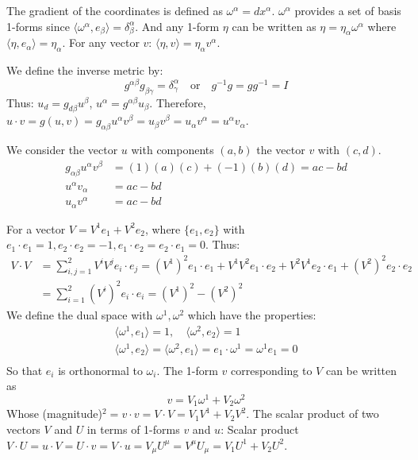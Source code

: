 \documentclass{article}
\begin{document}
    The gradient of the coordinates is defined as $\omega^\alpha = dx^\alpha$.
    $\omega^\alpha$ provides a set of basis 1-forms since $\langle \omega^\alpha, e_\beta \rangle = \delta^\alpha_\beta$.
    And any 1-form $\eta$ can be written as $\eta = \eta_\alpha \omega^\alpha$ where $\langle \eta, e_\alpha \rangle = \eta_\alpha$.
    For any vector $v$: $\langle \eta, v \rangle = \eta_\alpha v^\alpha$.
    
    We define the inverse metric by:
    $$ g^{\alpha\beta} g_{\beta\gamma} = \delta^\alpha_\gamma \quad \text{or} \quad g^{-1}g=gg^{-1}=I $$
    Thus: $u_d = g_{d\beta} u^\beta$, $u^\alpha = g^{\alpha\beta} u_\beta$.
    Therefore, $u \cdot v = g(u, v) = g_{\alpha\beta} u^\alpha v^\beta = u_\beta v^\beta = u_\alpha v^\alpha = u^\alpha v_\alpha$.
    
    We consider the vector $u$ with components $(a,b)$ the vector $v$ with $(c,d)$.
    \begin{align*}
    	g_{\alpha\beta} u^\alpha v^\beta &= (1)(a)(c) + (-1)(b)(d) = ac-bd \\
    	u^\alpha v_\alpha &= ac-bd \\
    	u_\alpha v^\alpha &= ac-bd
    \end{align*}
    
    For a vector $V = V^1 e_1 + V^2 e_2$, where $\{e_1, e_2\}$ with $e_1 \cdot e_1 = 1, e_2 \cdot e_2 = -1, e_1 \cdot e_2 = e_2 \cdot e_1 = 0$.
    Thus:
    \begin{align*}
    	V \cdot V &= \sum_{i,j=1}^2 V^i V^j e_i \cdot e_j = (V^1)^2 e_1 \cdot e_1 + V^1 V^2 e_1 \cdot e_2 + V^2 V^1 e_2 \cdot e_1 + (V^2)^2 e_2 \cdot e_2 \\
    	&= \sum_{i=1}^2 (V^i)^2 e_i \cdot e_i = (V^1)^2 - (V^2)^2
    \end{align*}
    We define the dual space with $\omega^1, \omega^2$ which have the properties:
    \begin{gather*}
    	\langle \omega^1, e_1 \rangle = 1, \quad \langle \omega^2, e_2 \rangle = 1 \\
    	\langle \omega^1, e_2 \rangle = \langle \omega^2, e_1 \rangle = e_1 \cdot \omega^1 = \omega^1 e_1 = 0 \\
    \end{gather*}
    So that $e_i$ is orthonormal to $\omega_i$.
    The 1-form $v$ corresponding to $V$ can be written as
    $$ v = V_1 \omega^1 + V_2 \omega^2 $$
    Whose (magnitude)$^2 = v \cdot v = V \cdot V = V_1 V^1 + V_2 V^2$.
    The scalar product of two vectors $V$ and $U$ in terms of 1-forms $v$ and $u$:
    Scalar product $V \cdot U = u \cdot V = U \cdot v = V \cdot u = V_\mu U^\mu = V^\mu U_\mu = V_1 U^1 + V_2 U^2$.
    
\end{document}
